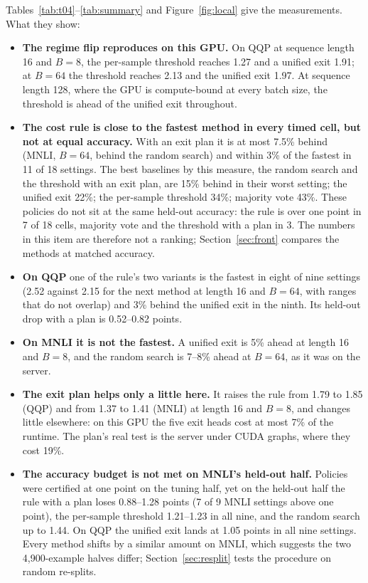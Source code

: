 Tables~\ref{tab:t04}--\ref{tab:summary} and Figure~\ref{fig:local} give the measurements. What they show:
\begin{itemize}
  \item \textbf{The regime flip reproduces on this GPU.} On QQP at sequence length 16 and $B=8$, the per-sample
  threshold reaches 1.27\x{} and a unified exit 1.91\x; at $B=64$ the threshold reaches 2.13\x{} and the unified exit
  1.97\x. At sequence length 128, where the GPU is compute-bound at every batch size, the threshold is ahead of the
  unified exit throughout.
  \item \textbf{The cost rule is close to the fastest method in every timed cell, but not at equal accuracy.} With
  an exit plan it is at most 7.5\% behind (MNLI, $B=64$, behind the random search) and within 3\% of the fastest in
  11 of 18 settings. The best baselines by this measure, the random search and the threshold with an exit plan, are
  15\% behind in their worst setting; the unified exit 22\%; the per-sample threshold 34\%; majority vote 43\%. These
  policies do not sit at the same held-out accuracy: the rule is over one point in 7 of 18 cells, majority vote and
  the threshold with a plan in 3. The numbers in this item are therefore not a ranking; Section~\ref{sec:front}
  compares the methods at matched accuracy.
  \item \textbf{On QQP} one of the rule's two variants is the fastest in eight of nine settings (2.52\x{} against
  2.15\x{} for the next method at length 16 and $B=64$, with ranges that do not overlap) and 3\% behind the unified
  exit in the ninth. Its held-out drop with a plan is 0.52--0.82 points.
  \item \textbf{On MNLI it is not the fastest.} A unified exit is 5\% ahead at length 16 and $B=8$, and the random
  search is 7--8\% ahead at $B=64$, as it was on the server.
  \item \textbf{The exit plan helps only a little here.} It raises the rule from 1.79\x{} to 1.85\x{} (QQP) and from
  1.37\x{} to 1.41\x{} (MNLI) at length 16 and $B=8$, and changes little elsewhere: on this GPU the five exit heads
  cost at most 7\% of the runtime. The plan's real test is the server under CUDA graphs, where they cost 19\%.
  \item \textbf{The accuracy budget is not met on MNLI's held-out half.} Policies were certified at one point on the
  tuning half, yet on the held-out half the rule with a plan loses 0.88--1.28 points (7 of 9 MNLI settings above one
  point), the per-sample threshold 1.21--1.23 in all nine, and the random search up to 1.44. On QQP the unified exit
  lands at 1.05 points in all nine settings. Every method shifts by a similar amount on MNLI, which suggests the two
  4{,}900-example halves differ; Section~\ref{sec:resplit} tests the procedure on random re-splits.
\end{itemize}
